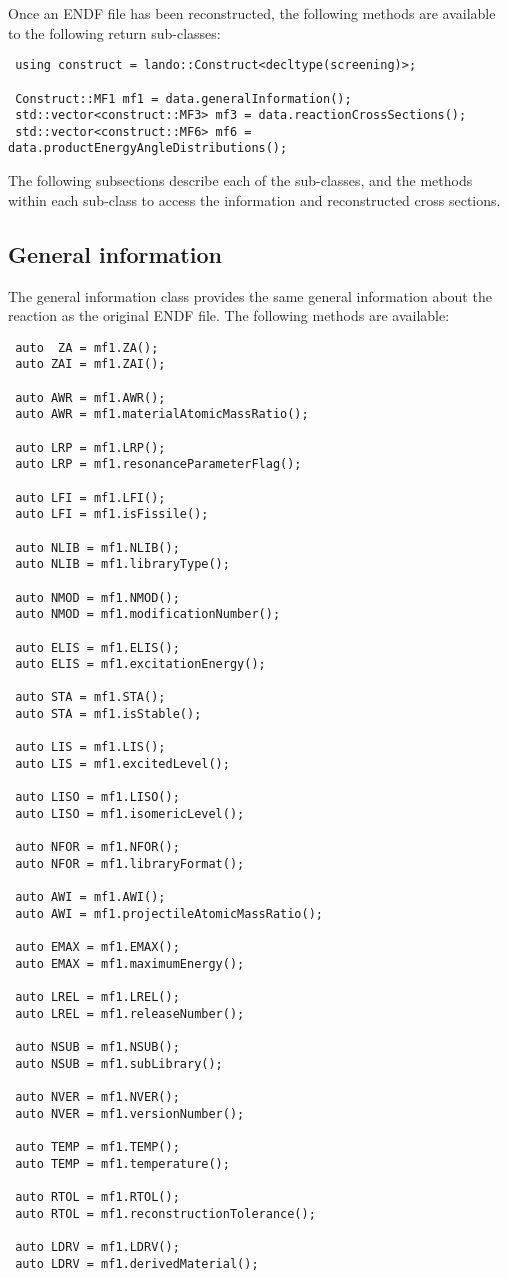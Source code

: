 \documentclass[../main.tex]{subfiles}
\begin{document}
Once an ENDF file has been reconstructed, the following methods are available to the following return sub-classes:

\begin{verbatim}
 using construct = lando::Construct<decltype(screening)>;
  
 Construct::MF1 mf1 = data.generalInformation();
 std::vector<construct::MF3> mf3 = data.reactionCrossSections();
 std::vector<construct::MF6> mf6 = data.productEnergyAngleDistributions();
\end{verbatim}

The following subsections describe each of the sub-classes, and the methods within each sub-class to access the information and reconstructed cross sections.

\subsection{General information}
The general information class provides the same general information about the reaction as the original ENDF file. The following methods are available:
\begin{verbatim}
 auto  ZA = mf1.ZA();
 auto ZAI = mf1.ZAI();
  
 auto AWR = mf1.AWR();
 auto AWR = mf1.materialAtomicMassRatio();

 auto LRP = mf1.LRP();
 auto LRP = mf1.resonanceParameterFlag();

 auto LFI = mf1.LFI();
 auto LFI = mf1.isFissile();

 auto NLIB = mf1.NLIB();
 auto NLIB = mf1.libraryType();

 auto NMOD = mf1.NMOD();
 auto NMOD = mf1.modificationNumber();

 auto ELIS = mf1.ELIS();
 auto ELIS = mf1.excitationEnergy();

 auto STA = mf1.STA();
 auto STA = mf1.isStable();

 auto LIS = mf1.LIS();
 auto LIS = mf1.excitedLevel();

 auto LISO = mf1.LISO();
 auto LISO = mf1.isomericLevel();

 auto NFOR = mf1.NFOR();
 auto NFOR = mf1.libraryFormat();

 auto AWI = mf1.AWI();
 auto AWI = mf1.projectileAtomicMassRatio();

 auto EMAX = mf1.EMAX();
 auto EMAX = mf1.maximumEnergy();

 auto LREL = mf1.LREL();
 auto LREL = mf1.releaseNumber();

 auto NSUB = mf1.NSUB();
 auto NSUB = mf1.subLibrary();

 auto NVER = mf1.NVER();
 auto NVER = mf1.versionNumber();

 auto TEMP = mf1.TEMP();
 auto TEMP = mf1.temperature();

 auto RTOL = mf1.RTOL();
 auto RTOL = mf1.reconstructionTolerance();

 auto LDRV = mf1.LDRV();
 auto LDRV = mf1.derivedMaterial();
\end{verbatim}
\end{document}
